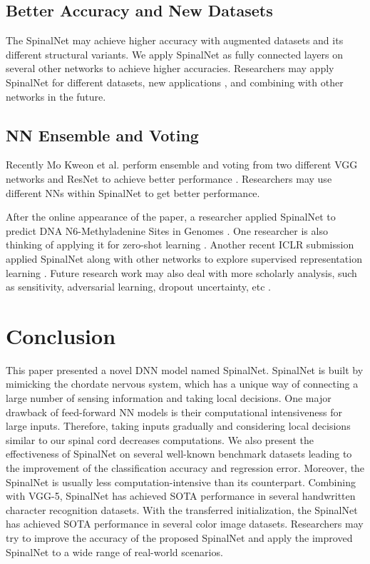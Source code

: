 \documentclass[journal]{IEEEtran}
\begin{document}
\subsection{Better Accuracy and New Datasets}
The SpinalNet may achieve higher accuracy with augmented datasets and its different structural variants. We apply SpinalNet as fully connected layers on several other networks to achieve higher accuracies. Researchers may apply SpinalNet for different datasets, new applications \cite{kabir2018neural,rahman2018unified, neven2018towards}, and combining with other networks in the future. 

\subsection{NN Ensemble and Voting}
Recently Mo Kweon et al. perform ensemble and voting from two different VGG networks and ResNet to achieve better performance \cite{VGG5}. Researchers may use different NNs within SpinalNet to get better performance.

After the online appearance of the paper, a researcher applied SpinalNet to predict DNA N6-Methyladenine Sites in Genomes \cite{abbas2020spinenet}. One researcher is also thinking of applying it for zero-shot learning \cite{pourpanah2020review}. Another recent ICLR submission applied SpinalNet along with other networks to explore supervised representation learning \cite{Anonymous2021ICLR}. Future research work may also deal with more scholarly analysis, such as sensitivity, adversarial learning, dropout uncertainty, etc \cite{pizarroso2020neuralsens, kamal2021alzheimer, theisen2021evaluating}. 

\section{Conclusion}
This paper presented a novel DNN model named SpinalNet. SpinalNet is built by mimicking the chordate nervous system, which has a unique way of connecting a large number of sensing information and taking local decisions. One major drawback of feed-forward NN models is their computational intensiveness for large inputs. Therefore, taking inputs gradually and considering local decisions similar to our spinal cord decreases computations. We also present the effectiveness of SpinalNet on several well-known benchmark datasets leading to the improvement of the classification accuracy and regression error. Moreover, the SpinalNet is usually less computation-intensive than its counterpart. Combining with VGG-5, SpinalNet has achieved SOTA performance in several handwritten character recognition datasets. With the transferred initialization, the SpinalNet has achieved SOTA performance in several color image datasets. Researchers may try to improve the accuracy of the proposed SpinalNet and apply the improved SpinalNet to a wide range of real-world scenarios.



\end{document}
